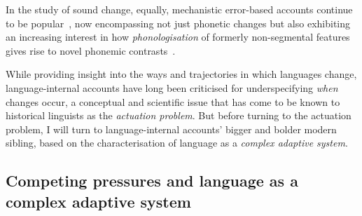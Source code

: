 In the study of sound change, equally, mechanistic error-based accounts continue to be popular~\citep[see e.g.][who make specific reference to the importance of \emph{asymmetries} between phonetic variants to explain change]{Garrett2013}, %
now encompassing not just phonetic changes but also exhibiting an increasing interest in how \emph{phonologisation} of formerly non-segmental features gives rise to novel phonemic contrasts~\citep[e.g.][]{Kirby2013}.

While providing insight into the ways and trajectories in which languages change, language-internal accounts have long been criticised for underspecifying \emph{when} changes occur, a conceptual and scientific issue that has come to be known to historical linguists as the \emph{actuation problem}. But before turning to the actuation problem, I will turn to language-internal accounts' bigger and bolder modern sibling, based on the characterisation of language as a \emph{complex adaptive system}.



\subsection{Competing pressures and language as a complex adaptive system}
\label{sec:lcas}


